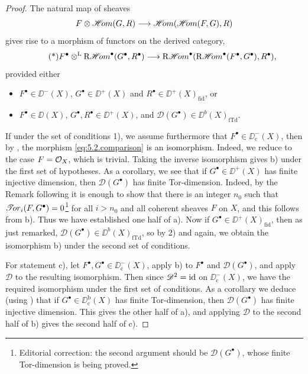 \begin{proof}
The natural map of sheaves
\[
F\otimes\mathop{\mathscr{H}\!om}\nolimits(G,R)\longrightarrow \mathop{\mathscr{H}\!om}\nolimits(\mathop{\mathscr{H}\!om}\nolimits(F,G),R)
\]
gives rise to a morphism of functors on the derived category,
\[
\tag{*}\label{eq:5.2.comparison}
F^\bullet\mathbin{\otimes^{\mathrm{L}}} \mathop{\mathrm{R}\mathscr{H}\!om}\nolimits^\bullet(G^\bullet,R^\bullet)\longrightarrow \mathop{\mathrm{R}\mathscr{H}\!om}\nolimits^\bullet(\mathop{\mathrm{R}\mathscr{H}\!om}\nolimits^\bullet(F^\bullet,G^\bullet),R^\bullet),
\]
provided either
\begin{itemize}
\item[1)] $F^\bullet\in\DD^{-}(X)$, $G^\bullet\in\DD^{+}(X)$ and $R^\bullet\in\DD^{+}(X)_{\mathrm{fid}}$, or
\item[2)] $F^\bullet\in\DD(X)$, $G^\bullet,R^\bullet\in\DD^+(X)$, and $\mathscr{D}(G^\bullet)\in\DD^b(X)_{\mathrm{fTd}}$.
\end{itemize}
If under the set of conditions 1), we assume furthermore that $F^\bullet\in\DD^-_{\mathrm{c}}(X)$, then by , the morphism \eqref{eq:5.2.comparison} is an isomorphism. Indeed, we reduce to the case $F=\mathcal{O}_X$, which is trivial. Taking the inverse isomorphism gives b) under the first set of hypotheses. As a corollary, we see that if $G^\bullet\in\DD^+(X)$ has finite injective dimension, then $\mathscr{D}(G^\bullet)$ has finite Tor-dimension. Indeed, by the Remark following  it is enough to show that there is an integer $n_0$ such that $\mathop{\mathscr{T}\!or}\nolimits_i(F,G^\bullet)=0$\footnote{Editorial correction: the second argument should be $\mathscr D(G^\bullet)$, whose finite Tor-dimension is being proved.} for all $i>n_0$ and all coherent sheaves $F$ on $X$, and this follows from b). Thus we have established one half of a). Now if $G^\bullet\in\DD^+(X)_{\mathrm{fid}}$, then as just remarked, $\mathscr{D}(G^\bullet)\in\DD^b(X)_{\mathrm{fTd}}$, so by 2) and  again, we obtain the isomorphism b) under the second set of conditions.

For statement c), let $F^\bullet,G^\bullet\in\DD^-_{\mathrm{c}}(X)$, apply b) to $F^\bullet$ and $\mathscr{D}(G^\bullet)$, and apply $\mathscr{D}$ to the resulting isomorphism. Then since $\mathscr{D}^2=\operatorname{id}$ on $\DD^-_{\mathrm{c}}(X)$, we have the required isomorphism under the first set of conditions. As a corollary we deduce (using ) that if $G^\bullet\in\DD^{\mathrm{b}}_{\mathrm{c}}(X)$ has finite Tor-dimension, then $\mathscr{D}(G^\bullet)$ has finite injective dimension. This gives the other half of a), and applying $\mathscr{D}$ to the second half of b) gives the second half of c).
\end{proof}

